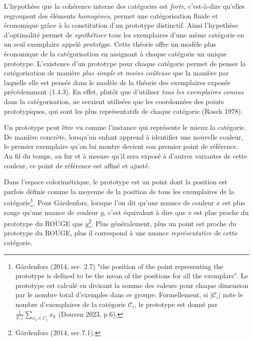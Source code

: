 \documentclass{article}
\begin{document}
L’hypothèse que la cohérence interne des catégories est \textit{forte}, c’est-à-dire qu’elles regroupent des éléments \textit{homogènes}, permet une catégorisation fluide et économique grâce à la constitution d’un prototype distinctif. Ainsi l’hypothèse d'optimalité permet de \textit{synthétiser} tous les exemplaires d'une même catégorie en un seul exemplaire appelé \textit{prototype}. Cette théorie offre un modèle plus économique de la catégorisation en assignant à chaque catégorie un unique prototype. L’existence d’un prototype pour chaque catégorie permet de penser la catégorisation de manière \textit{plus simple} et \textit{moins coûteuse} que la manière par laquelle elle est pensée dans le modèle de la théorie des exemplaires exposée précédemment (1.4.3). En effet, plutôt que d’utiliser \textit{tous les exemplaires connus} dans la catégorisation, ne seraient utilisées que les coordonnées des points prototypiques, qui sont les plus représentatifs de chaque catégorie (Rosch 1978).
\par
Un prototype peut être vu comme l’instance qui représente le mieux la catégorie. De manière concrète, lorsqu’un enfant apprend à identifier une nouvelle couleur, le premier exemplaire qu’on lui montre devient son premier point de référence. Au fil du temps, au fur et à mesure qu'il sera exposé à d’autres variantes de cette couleur, ce point de référence est affiné et ajusté.
\par
Dans l’espace colorimétrique, le prototype est un point dont la position est parfois définie comme la moyenne de la position de tous les exemplaires de la catégorie\footnote{Gärdenfors (2014, sec. 2.7) "the position of the point representing the prototype is defined to be the mean of the positions for all the exemplars". Le prototype est calculé en divisant la somme des valeurs pour chaque dimension par le nombre total d'exemples dans ce groupe. Formellement, si $|\mathcal{C}_i|$ note le nombre d'exemplaires de la catégorie $\mathcal{C}_i$, le prototype est donné par $\frac{1}{|C_i|} \sum_{x_k \in C_i} x_k$ (Douven 2023, p.6).}. Pour Gärdenfors, lorsque l’on dit qu’une nuance de couleur $x$ est \og plus rouge \fg qu’une nuance de couleur $y$, c’est équivalent à dire que $x$ est plus proche du prototype du ROUGE que $y$\footnote{Gärdenfors (2014, sec.7.1).}. Plus généralement, plus un point est proche du prototype du ROUGE, plus il correspond à une nuance \textit{représentative} de cette catégorie.
\par
\end{document}

